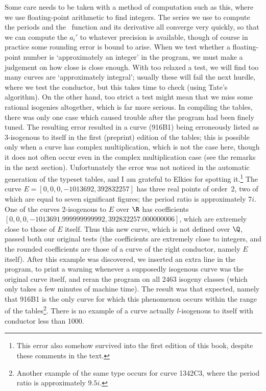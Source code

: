 Some care needs to be taken with a method of computation such as this,
where we use floating-point arithmetic to find integers.  The series
we use to compute the periods and the \W\ function and its derivative
all converge very quickly, so that we can compute the $a_i'$ to
whatever precision is available, though of course in practice some
rounding error is bound to arise.  When we test whether a
floating-point number is `approximately an integer' in the program, we
must make a judgement on how close is close enough.  With too relaxed
a test, we will find too many curves are `approximately integral';
usually these will fail the next hurdle, where we test the conductor,
but this takes time to check (using Tate's algorithm).  On the other
hand, too strict a test might mean that we miss some rational
isogenies altogether, which is far more serious. In compiling the
tables, there was only one case which caused trouble after the program
had been finely tuned.  The resulting error resulted in a curve
(916B1) being erroneously listed as 3-isogenous to itself in the first
(preprint) edition of the tables; this is possible only when a curve
has complex multiplication, which is not the case here, though it does
not often occur even in the complex multiplication case (see the
remarks in the next section). Unfortunately the error was not noticed
in the automatic generation of the typeset tables, and I am grateful
to Elkies for spotting it.\footnote{This error also somehow survived
into the first edition of this book, despite these comments in the
text.}  The curve $E=[0,0,0,-1013692,392832257]$ has three real points
of order~2, two of which are equal to seven significant figures; the
period ratio is approximately $7i$.  One of the curves 2-isogenous to
$E$ over $\R$ has coefficients
$[0,0,0,-1013691.999999999992,392832257.000000006]$, which are
extremely close to those of $E$ itself.  Thus this new curve, which is
not defined over $\Q$, passed both our original tests (the
coefficients are extremely close to integers, and the rounded
coefficients are those of a curve of the right conductor, namely $E$
itself).  After this example was discovered, we inserted an extra line
in the program, to print a warning whenever a supposedly isogenous
curve was the original curve itself, and reran the program on all 2463
isogeny classes (which only takes a few minutes of machine time).  The
result was that expected, namely that 916B1 is the only curve for
which this phenomenon occurs within the range of the
tables\footnote{Another example of the same type occurs for curve
1342C3, where the period ratio is approximately $9.5i$.}.  There is no
example of a curve actually $l$-isogenous to itself with conductor
less than 1000.

